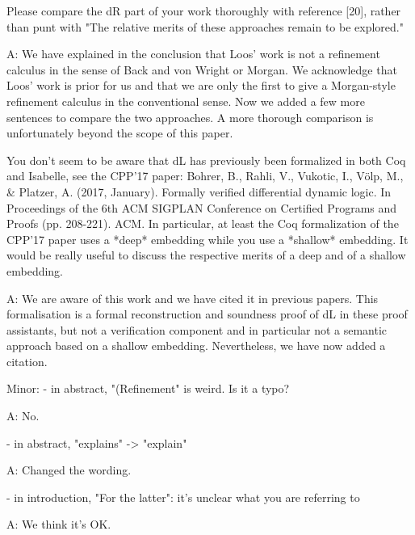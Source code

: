 \documentclass[envcountsame,envcountsect]{llncs}
\begin{document}
Please compare the dR part of your work thoroughly with reference [20], rather than punt with "The relative merits of these approaches remain to be explored."

A: We have explained in the conclusion that Loos' work is not a refinement calculus in the sense of Back and von Wright or Morgan. We acknowledge that Loos' work is prior for us and that we are only the first to give a Morgan-style refinement calculus in the conventional sense. Now we added a few more sentences to compare the two approaches. A more thorough comparison is unfortunately beyond the scope of this paper.

You don't seem to be aware that dL has previously been formalized in both Coq and Isabelle, see the CPP'17 paper:
  Bohrer, B., Rahli, V., Vukotic, I., Völp, M., \& Platzer, A. (2017, January).  Formally verified differential dynamic logic. In Proceedings of the 6th ACM SIGPLAN Conference on Certified Programs and Proofs (pp. 208-221). ACM.
In particular, at least the Coq formalization of the CPP'17 paper uses a *deep* embedding while you use a *shallow* embedding. It would be really useful to discuss the respective merits of a deep and of a shallow embedding.

A: We are aware of this work and we have cited it in previous papers. This formalisation is a formal reconstruction and soundness proof of dL in these proof assistants, but not a verification component and in particular not a semantic approach based on a shallow embedding. Nevertheless, we have now added a citation.


Minor:
- in abstract, "(Refinement" is weird. Is it a typo?

A: No. 

- in abstract, "explains" -> "explain"

A: Changed the wording.

- in introduction, "For the latter": it's unclear what you are referring to

A: We think it's OK.







\end{document}
